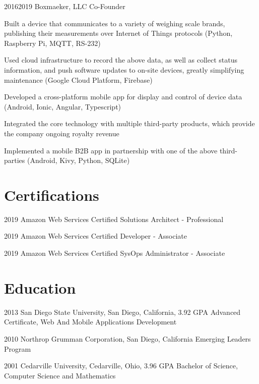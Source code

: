 \documentclass{article}
\begin{document}
\job
  {2016}{2019}
  {Boxmaeker, LLC}
  {Co-Founder}
  {\begin{achievements}
    \item Built a device that communicates to a variety of weighing scale brands, publishing their measurements over Internet of Things protocols (Python, Raspberry Pi, MQTT, RS-232)
    \item Used cloud infrastructure to record the above data, as well as collect status information, and push software updates to on-site devices, greatly simplifying maintenance (Google Cloud Platform, Firebase)
    \item Developed a cross-platform mobile app for display and control of device data (Android, Ionic, Angular, Typescript)
    \item Integrated the core technology with multiple third-party products, which provide the company ongoing royalty revenue
    \item Implemented a mobile B2B app in partnership with one of the above third-parties (Android, Kivy, Python, SQLite)
  \end{achievements}}


\section{Certifications}

\education
  {2019}
  {Amazon Web Services}
  {Certified Solutions Architect - Professional}

\education
  {2019}
  {Amazon Web Services}
  {Certified Developer - Associate}


\education
  {2019}
  {Amazon Web Services}
  {Certified SysOps Administrator - Associate}


\section{Education}

\education
  {2013}
  {San Diego State University, San Diego, California, 3.92 GPA}
  {Advanced Certificate, Web And Mobile Applications Development}

\education
  {2010}
  {Northrop Grumman Corporation, San Diego, California}
  {Emerging Leaders Program}

\education
  {2001}
  {Cedarville University, Cedarville, Ohio, 3.96 GPA}
  {Bachelor of Science, Computer Science and Mathematics}


\section{}

\credits
\end{document}
